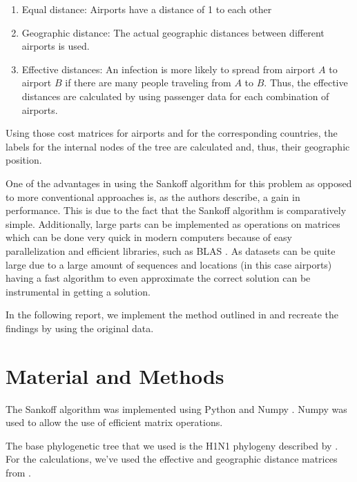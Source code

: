 \documentclass{article}
\begin{document}
\begin{enumerate}
  \item Equal distance: Airports have a distance of 1 to each other
  \item Geographic distance: The actual geographic distances between different
  airports is used.
  \item Effective distances: An infection is more likely to spread from
  airport $A$ to airport $B$ if there are many people traveling from $A$ to
  $B$. Thus, the effective distances are calculated by using passenger data
  for each combination of airports.
\end{enumerate}

Using those cost matrices for airports and for the corresponding countries, the
labels for the internal nodes of the tree are calculated and, thus, their
geographic position.

One of the advantages in using the Sankoff algorithm for this problem as opposed to more
conventional approaches is, as the authors describe, a gain in performance. This is due to the fact
that the Sankoff algorithm is comparatively simple. Additionally, large parts can be implemented as
operations on matrices which can be done very quick in modern computers because of easy
parallelization and efficient libraries, such as BLAS \cite{lawsonBasicLinearAlgebra1979}. As
datasets can be quite large due to a large
amount of sequences and locations (in this case airports) having a fast
algorithm to even approximate the correct solution can be instrumental in getting a solution.

In the following report, we implement the method outlined in
\cite{reimeringPhylogeographicReconstructionUsing2020} and recreate the findings
by using the original data.

\section{Material and Methods}
The Sankoff algorithm was implemented using Python 
\cite{pythonsoftwarefoundationWelcomePythonOrg2023} and Numpy \cite{harrisArrayProgrammingNumPy2020}. Numpy was used to allow the use of
efficient matrix operations.

The base phylogenetic tree that we used is the H1N1 phylogeny described by
\cite{reimeringPhylogeographicReconstructionUsing2020}. For the calculations,
we've used the effective and geographic distance matrices from
\cite{reimeringDistanceMatricesParsimonious2019}. 
\end{document}
